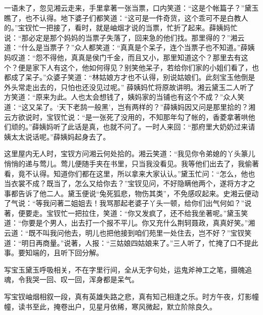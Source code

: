 \begin{parag}
    一语未了，忽见湘云走来，手里拿著一张当票，口内笑道：“这是个帐篇子？”黛玉瞧了，也不认得。地下婆子们都笑道：“这可是一件奇货，这个乖可不是白教人的。”宝钗忙一把接了，看时，就是岫烟才说的当票，忙折了起来。薛姨妈忙说：“那必定是那个妈妈的当票子失落了，回来急的他们找。那里得的？”湘云道：“什么是当票子？”众人都笑道：“真真是个呆子，连个当票子也不知道。”薛姨妈叹道：“怨不得他，真真是侯门千金，而且又小，那里知道这个？那里去有这个？便是家下人有这个，他如何得见？别笑他呆子，若给你们家的小姐们看了，也都成了呆子。”众婆子笑道：“林姑娘方才也不认得，别说姑娘们。此刻宝玉他倒是外头常走出去的，只怕也还没见过呢。” 薛姨妈忙将原故讲明。湘云黛玉二人听了方笑道：“原来为此。人也太会想钱了，姨妈家的当铺也有这个不成？”众人笑道：“这又呆了。‘天下老鸹一般黑’，岂有两样的？”薛姨妈因又问是那里拾的？湘云方欲说时，宝钗忙说：“是一张死了没用的，不知那年勾了帐的，香菱拿著哄他们顽的。”薛姨妈听了此话是真，也就不问了。一时人来回：“那府里大奶奶过来请姨太太说话呢。”薛姨妈起身去了。
\end{parag}


\begin{parag}
    这里屋内无人时，宝钗方问湘云何处拾的。湘云笑道：“我见你令弟媳的丫头篆儿悄悄的递与莺儿。莺儿便随手夹在书里，只当我没看见。我等他们出去了，我偷著看，竟不认得。知道你们都在这里，所以拿来大家认认。”黛玉忙问：“怎么，他也当衣裳不成？既当了，怎么又给你去？”宝钗见问，不好隐瞒他两个，遂将方才之事都告诉了他二人。黛玉便说“兔死狐悲，物伤其类”，不免感叹起来。史湘云便动了气说：“等我问著二姐姐去！我骂那起老婆子丫头一顿，给你们出气何如？”说著，便要走。宝钗忙一把拉住，笑道：“你又发疯了，还不给我坐著呢。”黛玉笑道：“你要是个男人，出去打一个报不平儿。你又充什么荆轲聂政，真真好笑。”湘云道：“既不叫我问他去，明儿也把他接到咱们苑里一处住去，岂不好？”宝钗笑道：“明日再商量。”说著，人报：“三姑娘四姑娘来了。”三人听了，忙掩了口不提此事。要知端的，且听下回分解。
\end{parag}


\begin{parag}
    \begin{note}写宝玉黛玉呼吸相关，不在字里行间，全从无字句处，运鬼斧神工之笔，摄魄追魂，令我哭一回、叹一回，浑身都是呆气。\end{note}
\end{parag}


\begin{parag}
    \begin{note}写宝钗岫烟相叙一段，真有英雄失路之悲，真有知己相逢之乐。时方午夜，灯影幢幢，读书至此，掩卷出户，见星月依稀，寒风微起，默立阶除良久。\end{note}
\end{parag}

